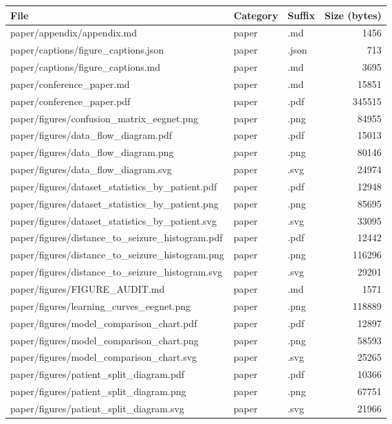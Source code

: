\begin{tabular}{lllr}
\toprule
File & Category & Suffix & Size (bytes) \\
\midrule
paper/appendix/appendix.md & paper & .md & 1456 \\
paper/captions/figure\_captions.json & paper & .json & 713 \\
paper/captions/figure\_captions.md & paper & .md & 3695 \\
paper/conference\_paper.md & paper & .md & 15851 \\
paper/conference\_paper.pdf & paper & .pdf & 345515 \\
paper/figures/confusion\_matrix\_eegnet.png & paper & .png & 84955 \\
paper/figures/data\_flow\_diagram.pdf & paper & .pdf & 15013 \\
paper/figures/data\_flow\_diagram.png & paper & .png & 80146 \\
paper/figures/data\_flow\_diagram.svg & paper & .svg & 24974 \\
paper/figures/dataset\_statistics\_by\_patient.pdf & paper & .pdf & 12948 \\
paper/figures/dataset\_statistics\_by\_patient.png & paper & .png & 85695 \\
paper/figures/dataset\_statistics\_by\_patient.svg & paper & .svg & 33095 \\
paper/figures/distance\_to\_seizure\_histogram.pdf & paper & .pdf & 12442 \\
paper/figures/distance\_to\_seizure\_histogram.png & paper & .png & 116296 \\
paper/figures/distance\_to\_seizure\_histogram.svg & paper & .svg & 29201 \\
paper/figures/FIGURE\_AUDIT.md & paper & .md & 1571 \\
paper/figures/learning\_curves\_eegnet.png & paper & .png & 118889 \\
paper/figures/model\_comparison\_chart.pdf & paper & .pdf & 12897 \\
paper/figures/model\_comparison\_chart.png & paper & .png & 58593 \\
paper/figures/model\_comparison\_chart.svg & paper & .svg & 25265 \\
paper/figures/patient\_split\_diagram.pdf & paper & .pdf & 10366 \\
paper/figures/patient\_split\_diagram.png & paper & .png & 67751 \\
paper/figures/patient\_split\_diagram.svg & paper & .svg & 21966 \\

\end{tabular}
